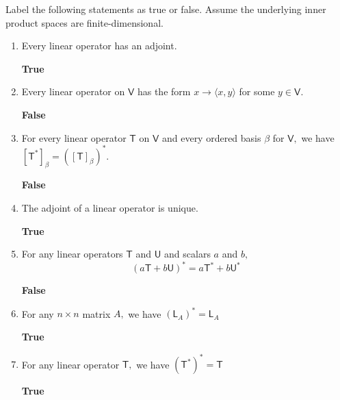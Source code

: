 Label the following statements as true or false. Assume the underlying
inner product spaces are finite-dimensional. 
\begin{enumerate}
\item Every linear operator has an adjoint. 

{\bf True}

\item Every linear operator on $\mathsf{V}$ has the form $x \to
  \langle x,y \rangle$ for some $y \in \mathsf{V}.$

{\bf False}

\item For every linear operator $\mathsf{T}$ on $\mathsf{V}$ and every
  ordered basis $\beta$ for $\mathsf{V},$ we have
  $[\mathsf{T}^*]_\beta = \left([\mathsf{T}]_\beta\right)^*.$

{\bf False}

\item The adjoint of a linear operator is unique.

{\bf True}

\item For any linear operators $\mathsf{T}$ and $\mathsf{U}$ and
  scalars $a$ and $b,$
\[
(a\mathsf{T}+b\mathsf{U})^* = a\mathsf{T}^* + b\mathsf{U}^*
\]

{\bf False}

\item For any $n \times n$ matrix $A,$ we have $(\mathsf{L}_A)^* =
  \mathsf{L}_A$

{\bf True}

\item For any linear operator $\mathsf{T},$ we have $(\mathsf{T}^*)^*
  = \mathsf{T}$

{\bf True}
\end{enumerate}
